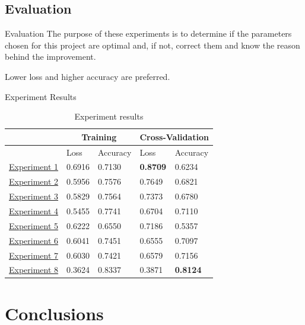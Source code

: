 \documentclass[11pt]{beamer}
\begin{document}
\subsection{Evaluation}
\begin{frame}{Evaluation}
	The purpose of these experiments is to determine if the parameters chosen for this project are optimal and, if not, correct them and know the reason behind the improvement.
	
	Lower loss and higher accuracy are preferred.
\end{frame}
\begin{frame}{Experiment Results}
	\begin{table}[!h]
	\caption{Experiment results}
	\vspace{0.2cm}
	\centering
	\begin{tabular}[t]{|l|l|l|l|l|}
	\hline
	\multicolumn{1}{|c|}{} & \multicolumn{2}{c|}{Training} & \multicolumn{2}{c|}{Cross-Validation}
	\\ \hline
	\ & Loss & Accuracy & Loss & Accuracy
	\\ \hline
	\hyperref[exp1]{Experiment 1} & 0.6916 & 0.7130 & \textbf{0.8709} & 0.6234
	\\ \hline
	\hyperref[exp2]{Experiment 2} & 0.5956 & 0.7576 & 0.7649 & 0.6821
	\\ \hline
	\hyperref[exp3]{Experiment 3} & 0.5829 & 0.7564 & 0.7373 & 0.6780
	\\ \hline
	\hyperref[exp4]{Experiment 4} & 0.5455 & 0.7741 & 0.6704 & 0.7110
	\\ \hline
	\hyperref[exp6]{Experiment 5} & 0.6222 & 0.6550 & 0.7186 & 0.5357
	\\ \hline
	\hyperref[exp7]{Experiment 6} & 0.6041 & 0.7451 & 0.6555 & 0.7097
	\\ \hline
	\hyperref[exp8]{Experiment 7} & 0.6030 & 0.7421 & 0.6579 & 0.7156
	\\ \hline
	\hyperref[exp9]{Experiment 8} & 0.3624 & 0.8337 & 0.3871 & \textbf{0.8124}
	\\ \hline
	\end{tabular}
\end{table}
\end{frame}

\section{Conclusions}
\end{document}
